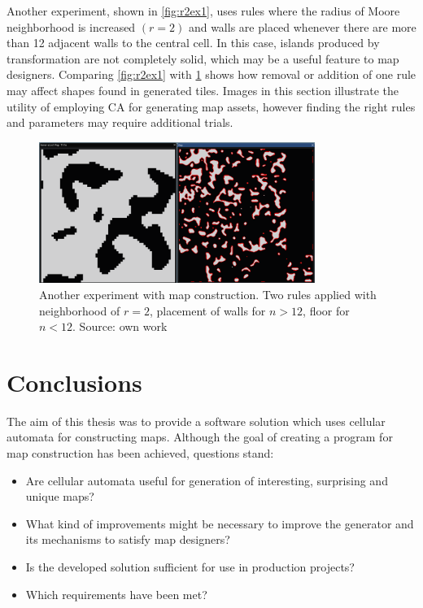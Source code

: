 \documentclass[12pt]{report}
\begin{document}
Another experiment, shown in \cref{fig:r2ex1}, uses rules where the radius of Moore neighborhood is increased $(r = 2)$ and walls are placed whenever there are more than 12 adjacent walls to the central cell. In this case, islands produced by transformation are not completely solid, which may be a useful feature to map designers. Comparing \cref{fig:r2ex1} with \cref{fig:ex3rst2} shows how removal or addition of one rule may affect shapes found in generated tiles. Images in this section illustrate the utility of employing CA for generating map assets, however finding the right rules and parameters may require additional trials.

\begin{figure}[h]
	\centering
	\includegraphics[width=0.8\textwidth]{images/ex3rst2}
	\caption{Another experiment with map construction. Two rules applied with neighborhood of $r = 2$, placement of walls for $n > 12$, floor for $n < 12$. Source: own work}
	\label{fig:ex3rst2}
\end{figure}




\chapter{Conclusions} \label{rozdzial.podsumowanie}

The aim of this thesis was to provide a software solution which uses cellular automata for constructing maps. Although the goal of creating a program for map construction has been achieved, questions stand: 

\begin{itemize}
	\item Are cellular automata useful for generation of interesting, surprising and unique maps?
	\item What kind of improvements might be necessary to improve the generator and its mechanisms to satisfy map designers? 
	\item Is the developed solution sufficient for use in production projects?  
	\item Which requirements have been met?
\end{itemize}
\end{document}
